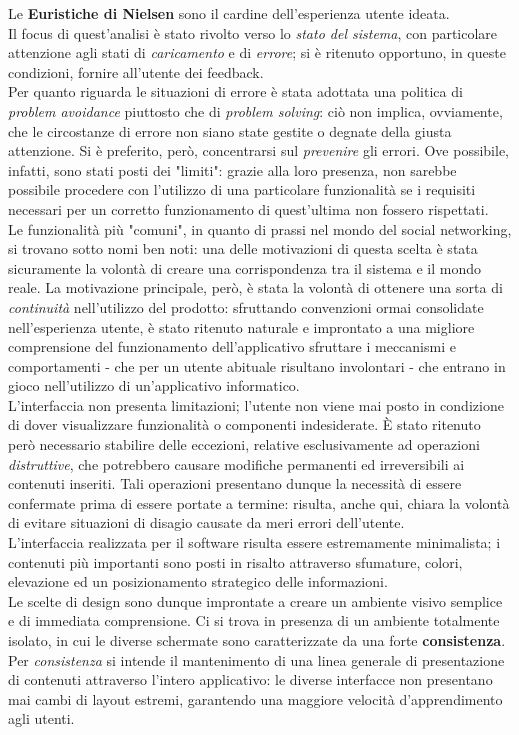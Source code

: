 \documentclass{natourDoc}
\begin{document}
Le \textbf{Euristiche di Nielsen} sono il cardine dell'esperienza utente ideata. \\
Il focus di quest'analisi è stato rivolto verso lo \textit{stato del sistema}, con particolare attenzione agli stati di \textit{caricamento} e di \textit{errore}; 
si è ritenuto opportuno, in queste condizioni, fornire all'utente dei feedback. \\
Per quanto riguarda le situazioni di errore è stata adottata una politica di \textit{problem avoidance} piuttosto che di \textit{problem solving}: ciò non implica, 
ovviamente, che le circostanze di errore non siano state gestite o degnate della giusta attenzione. Si è preferito, però, concentrarsi sul \textit{prevenire} gli errori. 
Ove possibile, infatti, sono stati posti dei "limiti": grazie alla loro presenza, non sarebbe possibile procedere con l'utilizzo di una particolare funzionalità se 
i requisiti necessari per un corretto funzionamento di quest'ultima non fossero rispettati. \\
Le funzionalità più "comuni", in quanto di prassi nel mondo del social networking, si trovano sotto nomi ben noti: una delle motivazioni di questa scelta è stata sicuramente la volontà di 
creare una corrispondenza tra il sistema e il mondo reale. La motivazione principale, però, è stata la volontà di ottenere una sorta di \textit{continuità} nell'utilizzo del prodotto: sfruttando convenzioni ormai 
consolidate nell'esperienza utente, è stato ritenuto naturale e improntato a una migliore comprensione del funzionamento dell'applicativo sfruttare i meccanismi 
 e comportamenti - che per un utente abituale risultano involontari - che entrano in gioco nell'utilizzo di un'applicativo informatico. \\
L'interfaccia non presenta limitazioni; l'utente non viene mai posto in condizione di dover visualizzare funzionalità o componenti indesiderate. 
È stato ritenuto però necessario stabilire delle eccezioni, relative esclusivamente ad operazioni \textit{distruttive}, che potrebbero causare modifiche permanenti ed irreversibili 
ai contenuti inseriti. Tali operazioni presentano dunque la necessità di essere confermate prima di essere portate a termine: risulta, anche qui, chiara la volontà di evitare 
situazioni di disagio causate da meri errori dell'utente.\\
L'interfaccia realizzata per il software risulta essere estremamente minimalista; i contenuti più importanti sono posti in risalto attraverso sfumature, colori, elevazione ed un 
posizionamento strategico delle informazioni. \\ 
Le scelte di design sono dunque improntate a creare un ambiente visivo semplice e di immediata comprensione. 
Ci si trova in presenza di un ambiente totalmente isolato, in cui le diverse schermate sono caratterizzate da una forte 
\textbf{consistenza}. Per \textit{consistenza} si intende il mantenimento di una linea generale di presentazione di contenuti attraverso 
l'intero applicativo: le diverse interfacce non presentano mai cambi di layout estremi, garantendo una maggiore velocità d'apprendimento agli utenti. \\
\end{document}
